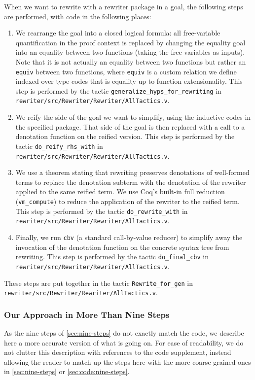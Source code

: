 \begin{subappendices}
When we want to rewrite with a rewriter package in a goal, the following steps are performed, with code in the following places:
\begin{enumerate}
  \item
    We rearrange the goal into a closed logical formula: all free-variable quantification in the proof context is replaced by changing the equality goal into an equality between two functions (taking the free variables as inputs).
    Note that it is not actually an equality between two functions but rather an \texttt{equiv} between two functions, where \texttt{equiv} is a custom relation we define indexed over type codes that is equality up to function extensionality.
    This step is performed by the tactic \texttt{generalize\_hyps\_for\_rewriting} in \texttt{rewriter/src/Rewriter/Rewriter/AllTactics.v}.
  \item
    We reify the side of the goal we want to simplify, using the inductive codes in the specified package.  That side of the goal is then replaced with a call to a denotation function on the reified version.
    This step is performed by the tactic \texttt{do\_reify\_rhs\_with} in \texttt{rewriter/src/Rewriter/Rewriter/AllTactics.v}.
  \item
    We use a theorem stating that rewriting preserves denotations of well-formed terms to replace the denotation subterm with the denotation of the rewriter applied to the same reified term.
    We use Coq's built-in full reduction (\texttt{vm\_compute}) to reduce the application of the rewriter to the reified term.
    This step is performed by the tactic \texttt{do\_rewrite\_with} in \texttt{rewriter/src/Rewriter/Rewriter/AllTactics.v}.
  \item
    Finally, we run \texttt{cbv} (a standard call-by-value reducer) to simplify away the invocation of the denotation function on the concrete syntax tree from rewriting.
    This step is performed by the tactic \texttt{do\_final\_cbv} in \texttt{rewriter/src/Rewriter/Rewriter/AllTactics.v}.
\end{enumerate}
These steps are put together in the tactic \texttt{Rewrite\_for\_gen} in \texttt{rewriter/src/Rewriter/Rewriter/AllTactics.v}.

\subsubsection{Our Approach in More Than Nine Steps}

As the nine steps of \autoref{sec:nine-steps} do not exactly match the code, we describe here a more accurate version of what is going on.
For ease of readability, we do not clutter this description with references to the code supplement, instead allowing the reader to match up the steps here with the more coarse-grained ones in \autoref{sec:nine-steps} or \autoref{sec:code:nine-steps}.


\end{subappendices}
